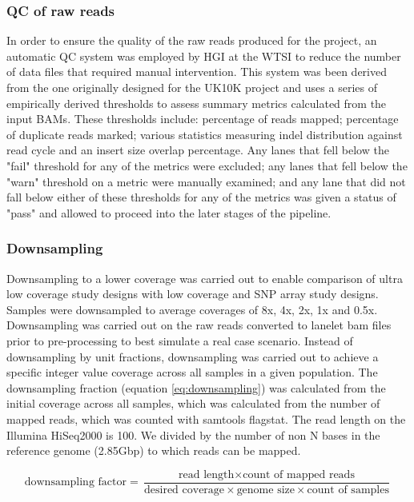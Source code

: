 \subsubsection{QC of raw reads}
In order to ensure the quality of the raw reads produced for the project, an automatic \gls{QC} system was employed by \gls{HGI} at the \gls{WTSI} to reduce the number of data files that required manual intervention. This system was been derived from the one originally designed for the UK10K project and uses a series of empirically derived thresholds to assess summary metrics calculated from the input \glspl{BAM}. These thresholds include: percentage of reads mapped; percentage of duplicate reads marked; various statistics measuring indel distribution against read cycle and an insert size overlap percentage. Any lanes that fell below the "fail" threshold for any of the metrics were excluded; any lanes that fell below the "warn" threshold on a metric were manually examined; and any lane that did not fall below either of these thresholds for any of the metrics was given a status of "pass" and allowed to proceed into the later stages of the pipeline.

\subsubsection{Downsampling}
Downsampling to a lower coverage was carried out to enable comparison of ultra low coverage study designs with low coverage and SNP array study designs. Samples were downsampled to average coverages of 8x, 4x, 2x, 1x and 0.5x. Downsampling was carried out on the raw reads converted to lanelet bam files prior to pre-processing to best simulate a real case scenario. Instead of downsampling by unit fractions\cite{10.1371/journal.pcbi.1002604}, downsampling was carried out to achieve a specific integer value coverage across all samples in a given population. The downsampling fraction (equation \ref{eq:downsampling}) was calculated from the initial coverage across all samples, which was calculated from the number of mapped reads, which was counted with samtools\cite{Li15082009} flagstat. The read length on the Illumina HiSeq2000 is 100. We divided by the number of non N bases in the reference genome (2.85\gls{Gbp}) to which reads can be mapped.

\begin{equation}
\text{downsampling factor} =  \frac
{\text{read length} \times \text{count of mapped reads}}
{\text{desired coverage} \times \text{genome size} \times \text{count of samples}}
\label{eq:downsampling}
\end{equation}

